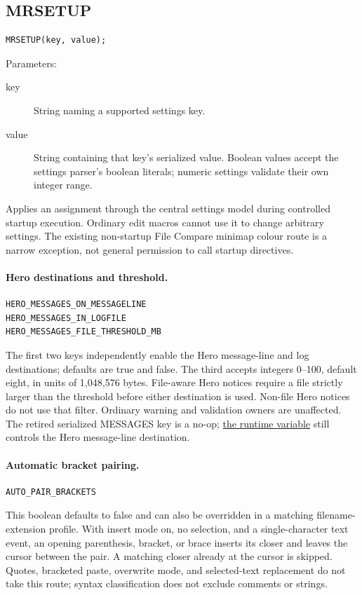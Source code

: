 \documentclass[a4paper,10pt,twoside,openany]{book}
\newenvironment{mrmacextension}{\begin{changebar}}{\end{changebar}}
\begin{document}
\begin{mrmacextension}
\label{prim:procedure-mrsetup}
\subsection*{MRSETUP}
\begin{verbatim}
MRSETUP(key, value);
\end{verbatim}
Parameters:
\begin{description}
\item[key] String naming a supported settings key.
\item[value] String containing that key's serialized value. Boolean values
accept the settings parser's boolean literals; numeric settings validate
their own integer range.
\end{description}

Applies an assignment through the central settings model during controlled
startup execution. Ordinary edit macros cannot use it to change arbitrary
settings. The existing non-startup File Compare minimap colour route is a
narrow exception, not general permission to call startup directives.

\paragraph{Hero destinations and threshold.}
\begin{verbatim}
HERO_MESSAGES_ON_MESSAGELINE
HERO_MESSAGES_IN_LOGFILE
HERO_MESSAGES_FILE_THRESHOLD_MB
\end{verbatim}
The first two keys independently enable the Hero message-line and log
destinations; defaults are true and false. The third accepts integers 0--100,
default eight, in units of 1,048,576 bytes. File-aware Hero notices require a
file strictly larger than the threshold before either destination is used.
Non-file Hero notices do not use that filter. Ordinary warning and validation
owners are unaffected. The retired serialized MESSAGES key is a no-op;
\hyperref[prim:variable-messages]{the runtime variable} still controls the
Hero message-line destination.

\paragraph{Automatic bracket pairing.}
\begin{verbatim}
AUTO_PAIR_BRACKETS
\end{verbatim}
This boolean defaults to false and can also be overridden in a matching
filename-extension profile. With insert mode on, no selection, and a
single-character text event, an opening parenthesis, bracket, or brace inserts
its closer and leaves the cursor between the pair. A matching closer already
at the cursor is skipped. Quotes, bracketed paste, overwrite mode, and
selected-text replacement do not take this route; syntax classification does
not exclude comments or strings.


\end{mrmacextension}
\end{document}
